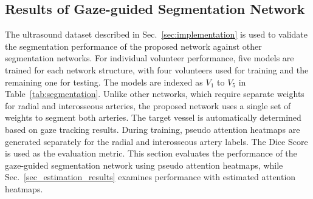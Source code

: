 \subsection{Results of Gaze-guided Segmentation Network}\label{sec_segmentation_results}
The ultrasound dataset described in Sec.~\ref{sec:implementation} is used to validate the segmentation performance of the proposed network against other segmentation networks. For individual volunteer performance, five models are trained for each network structure, with four volunteers used for training and the remaining one for testing. The models are indexed as $V_1$ to $V_5$ in Table~\ref{tab:segmentation}.
Unlike other networks, which require separate weights for radial and interosseous arteries, the proposed network uses a single set of weights to segment both arteries. The target vessel is automatically determined based on gaze tracking results. During training, pseudo attention heatmaps are generated separately for the radial and interosseous artery labels. The Dice Score is used as the evaluation metric.
This section evaluates the performance of the gaze-guided segmentation network using pseudo attention heatmaps, while Sec.~\ref{sec_estimation_results} examines performance with estimated attention heatmaps.


